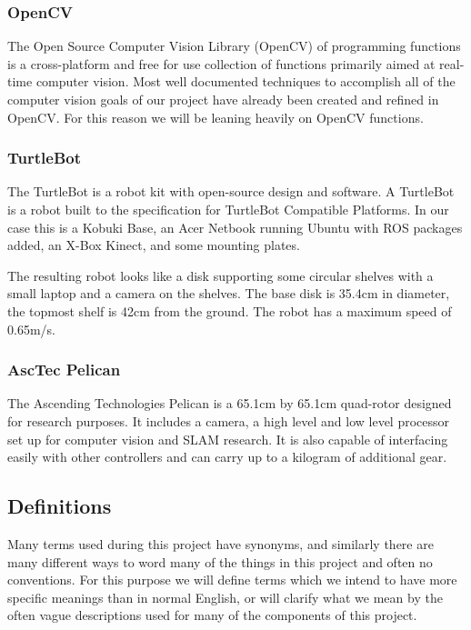 \documentclass{article}
\begin{document}
		\subsubsection{OpenCV}
		
		The Open Source Computer Vision Library (OpenCV) of programming functions is a cross-platform and free for use collection of functions primarily aimed at real-time computer vision\cite{opencv}. Most well documented techniques to accomplish all of the computer vision goals of our project have already been created and refined in OpenCV. For this reason we will be leaning heavily on OpenCV functions.
		
		\subsubsection{TurtleBot}
		
		The TurtleBot is a robot kit with open-source design and software. A TurtleBot is a robot built to the specification for TurtleBot Compatible Platforms\cite{wise_foote_2011}. In our case this is a Kobuki Base, an Acer Netbook running Ubuntu with ROS packages added, an X-Box Kinect, and some mounting plates. 
		
		The resulting robot looks like a disk supporting some circular shelves with a small laptop and a camera on the shelves. The base disk is 35.4cm in diameter, the topmost shelf is 42cm from the ground. The robot has a maximum speed of 0.65m/s. 
		
		\subsubsection{AscTec Pelican}
		
		The Ascending Technologies Pelican is a 65.1cm by 65.1cm quad-rotor  designed for research purposes\cite{asctec}. It includes a camera, a high level and low level processor set up for computer vision and SLAM research. It is also capable of interfacing easily with other controllers and can carry up to a kilogram of additional gear.
		
	\subsection{Definitions}
	
	Many terms used during this project have synonyms, and similarly there are many different ways to word many of the things in this project and often no conventions. For this purpose we will define terms which we intend to have more specific meanings than in normal English, or will clarify what we mean by the often vague descriptions used for many of the components of this project.
	
\end{document}
